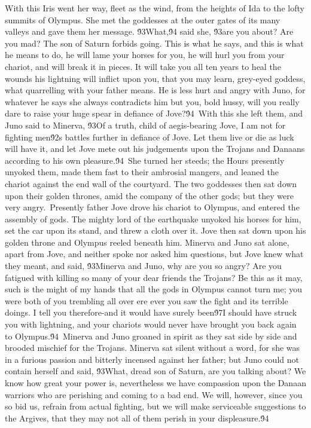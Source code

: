 {With this Iris went her way, fleet as the wind, from the heights of Ida to the lofty summits of Olympus. She met the goddesses at the outer gates of its many valleys and gave them her message. \'93What,\'94 said she, \'93are you about? Are you mad? The son of Saturn forbids going. This is what he says, and this is what he means to do, he will lame your horses for you, he will hurl you from your chariot, and will break it in pieces. It will take you all ten years to heal the wounds his lightning will inflict upon you, that you may learn, grey-eyed goddess, what quarrelling with your father means. He is less hurt and angry with Juno, for whatever he says she always contradicts him but you, bold hussy, will you really dare to raise your huge spear in defiance of Jove?\'94\
With this she left them, and Juno said to Minerva, \'93Of a truth, child of aegis-bearing Jove, I am not for fighting men\'92s battles further in defiance of Jove. Let them live or die as luck will have it, and let Jove mete out his judgements upon the Trojans and Danaans according to his own pleasure.\'94\
She turned her steeds; the Hours presently unyoked them, made them fast to their ambrosial mangers, and leaned the chariot against the end wall of the courtyard. The two goddesses then sat down upon their golden thrones, amid the company of the other gods; but they were very angry.\
Presently father Jove drove his chariot to Olympus, and entered the assembly of gods. The mighty lord of the earthquake unyoked his horses for him, set the car upon its stand, and threw a cloth over it. Jove then sat down upon his golden throne and Olympus reeled beneath him. Minerva and Juno sat alone, apart from Jove, and neither spoke nor asked him questions, but Jove knew what they meant, and said, \'93Minerva and Juno, why are you so angry? Are you fatigued with killing so many of your dear friends the Trojans? Be this as it may, such is the might of my hands that all the gods in Olympus cannot turn me; you were both of you trembling all over ere ever you saw the fight and its terrible doings. I tell you therefore-and it would have surely been\'97I should have struck you with lightning, and your chariots would never have brought you back again to Olympus.\'94\
Minerva and Juno groaned in spirit as they sat side by side and brooded mischief for the Trojans. Minerva sat silent without a word, for she was in a furious passion and bitterly incensed against her father; but Juno could not contain herself and said, \'93What, dread son of Saturn, are you talking about? We know how great your power is, nevertheless we have compassion upon the Danaan warriors who are perishing and coming to a bad end. We will, however, since you so bid us, refrain from actual fighting, but we will make serviceable suggestions to the Argives, that they may not all of them perish in your displeasure.\'94\
}
